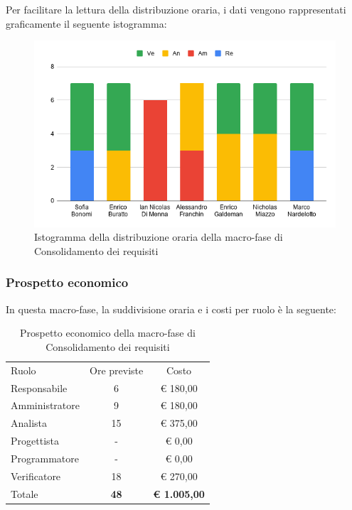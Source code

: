 \documentclass[../piano-di-progetto.tex]{subfiles}
\begin{document}
  Per facilitare la lettura della distribuzione oraria, i dati vengono rappresentati graficamente il seguente istogramma:
  \begin{figure}[H]
    \centering
    \includegraphics[width=12cm]{img/ore-consolidamento.png}
    \caption{Istogramma della distribuzione oraria della macro-fase di Consolidamento dei requisiti}
    \label{fig:ore-componente-consolidamento}
  \end{figure}

  \subsubsection{Prospetto economico}
  In questa macro-fase, la suddivisione oraria e i costi per ruolo è la seguente:

  \begin{table}[H]
    \centering
    \begin{tabular}{lcc}
      Ruolo          & Ore previste & Costo      \\
      Responsabile   & 6            & € 180,00   \\
      Amministratore & 9            & € 180,00   \\
      Analista       & 15           & € 375,00   \\
      Progettista    & -            & € 0,00     \\
      Programmatore  & -            & € 0,00     \\
      Verificatore   & 18           & € 270,00   \\
      Totale         & \textbf{48}           & \textbf{€ 1.005,00}
    \end{tabular}
    \caption{Prospetto economico della macro-fase di Consolidamento dei requisiti}
  \end{table}
\end{document}
